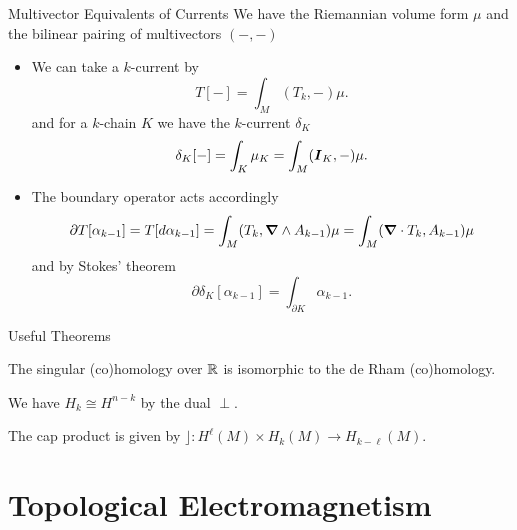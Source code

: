 \documentclass[UKenglish]{beamer}
\begin{document}
\begin{frame}{Multivector Equivalents of Currents}
\vfill
We have the Riemannian volume form $\mu$ and the bilinear pairing of multivectors $(-,-)$
\begin{itemize}
    \item We can take a $k$-current by
    \[
    T[-] = \int_M (T_k,-)\mu.
    \]
    and for a $k$-chain $K$ we have the $k$-current $\delta_K$
    \[
    \delta_K[-] = \int_K \mu_K = \int_M (\boldsymbol{I}_K,-)\mu.
    \]
    \item The boundary operator acts accordingly
    \[
    \partial T[\alpha_{k-1}] = T[d\alpha_{k-1}] = \int_M(T_k,\boldsymbol{\nabla} \wedge A_{k-1})\mu = \int_M (\boldsymbol{\nabla} \cdot T_k,A_{k-1})\mu
    \]
    and by Stokes' theorem
    \[
    \partial \delta_K[\alpha_{k-1}]= \int_{\partial K} \alpha_{k-1}.
    \]
\end{itemize}
\vfill
\end{frame}

\begin{frame}{Useful Theorems}
\vfill

    \begin{theorem}
        The singular (co)homology over $\mathbb{R}$ is isomorphic to the de Rham (co)homology.
    \end{theorem}
    \begin{theorem}
        We have $H_k\cong H^{n-k}$ by the dual $\perp$. %
    \end{theorem}
    \begin{theorem}
        The cap product is given by $\rfloor\colon H^\ell(M) \times H_k(M)\to H_{k-\ell}(M)$.
    \end{theorem}

\vfill
\end{frame}

\section{Topological Electromagnetism}
\end{document}
